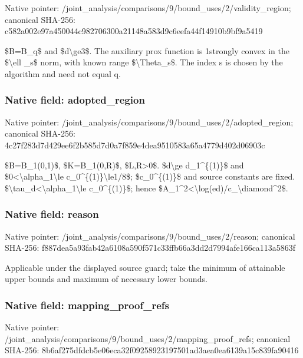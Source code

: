 \documentclass[10pt,a4paper]{article}
\begin{document}
Native pointer: /joint\_analysis/comparis\allowbreak{}ons/9/bound\_uses/2/valid\allowbreak{}ity\_region; canonical SHA-256: c582a002e97a450044c98270\allowbreak{}6300a21148a583d9c6eefa44\allowbreak{}f14910b9bf9a5419


\$B=B\_q\$ and \$d\textbackslash{}ge3\$. The auxiliary prox function is 1strongly convex in the \$\textbackslash{}ell \_s\$ norm, with known range \$\textbackslash{}Theta\_s\$. The index s is chosen by the algorithm and need not equal q.


\subsubsection{Native field: adopted\_region}


Native pointer: /joint\_analysis/comparis\allowbreak{}ons/9/bound\_uses/2/adopt\allowbreak{}ed\_region; canonical SHA-256: 4c27f283d7d429ee6f2b585d\allowbreak{}7d0a7f859e4dea9510583a65\allowbreak{}a4779d402d06903c


\$B=B\_1(0,1)\$, \$K=B\_1(0,R)\$, \$L,R>0\$. \$d\textbackslash{}ge d\_1\textasciicircum{}\{(1)\}\$ and \$0<\textbackslash{}alpha\_1\textbackslash{}le c\_0\textasciicircum{}\{(1)\}\textbackslash{}le1/8\$; \$c\_0\textasciicircum{}\{(1)\}\$ and source constants are fixed. \$\textbackslash{}tau\_d<\textbackslash{}alpha\_1\textbackslash{}le c\_0\textasciicircum{}\{(1)\}\$; hence \$A\_1\textasciicircum{}2<\textbackslash{}log(ed)/c\_\textbackslash{}diamond\textasciicircum{}2\$.


\subsubsection{Native field: reason}


Native pointer: /joint\_analysis/comparis\allowbreak{}ons/9/bound\_uses/2/reaso\allowbreak{}n; canonical SHA-256: f887dea5a93fab42a6108a59\allowbreak{}0f571c33ffb66a3dd2d7994a\allowbreak{}fe166ca113a5863f


Applicable under the displayed source guard; take the minimum of attainable upper bounds and maximum of necessary lower bounds.


\subsubsection{Native field: mapping\_proof\_refs}


Native pointer: /joint\_analysis/comparis\allowbreak{}ons/9/bound\_uses/2/mappi\allowbreak{}ng\_proof\_refs; canonical SHA-256: 8b6af275dfdcb5e06eca32f0\allowbreak{}9258923197501ad3aea0ea61\allowbreak{}39a15c839fa90416
\end{document}
